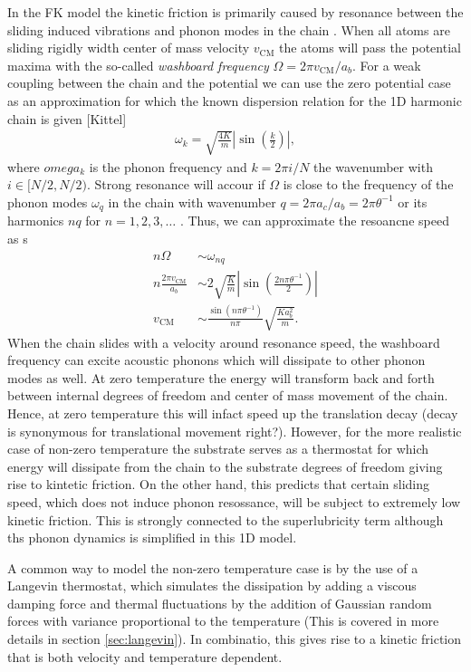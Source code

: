 In the FK model the kinetic friction is primarily caused by resonance between
the sliding induced vibrations and phonon modes in the chain \cite{FK2D}. When all atoms are sliding rigidly width center of mass velocity $v_{{\text{CM}}}$ the atoms will pass the potential maxima with the so-called \textit{washboard frequency} $\Omega = 2\pi v_{{\text{CM}}} / a_b$. For a weak coupling between the chain and the potential we can use the zero potential case as an approximation for which the known dispersion relation for the 1D harmonic chain is given [Kittel]
\begin{align*}
  \omega_k = \sqrt{\frac{4 K}{m}} \left|\sin{\left(\frac{k}{2}\right)}\right|,
\end{align*}
where $omega_k$ is the phonon frequency and $k = 2\pi i / N$ the wavenumber with $i\in [N/2, N/2)$. Strong resonance will accour if $\Omega$ is close to the frequency of the phonon modes $\omega_q$ in the chain with wavenumber $q = 2\pi a_c / a_b = 2\pi \theta^{-1}$ or its harmonics $nq$ for $n = 1, 2, 3, \hdots$ \cite{van_den_Ende_2012}. Thus, we can approximate the resoancne speed as s
\begin{align*}
    n \Omega &\sim \omega_{nq} \\
    n \frac{2\pi v_{\text{CM}}}{a_b} &\sim 2 \sqrt{\frac{K}{m}} \left| \sin{\left(\frac{2n \pi \theta^{-1}}{2}\right)}\right| \\
    v_{\text{CM}} &\sim \frac{\sin{(n\pi \theta^{-1})}}{n \pi} \sqrt{\frac{Ka_b^2}{m}}.
\end{align*}
When the chain slides with a velocity around resonance speed, the washboard frequency can excite acoustic phonons which will dissipate to other phonon modes as well. At zero temperature the energy will transform back and forth between internal degrees of freedom and center of mass movement of the chain. Hence, at zero temperature this will infact speed up the translation decay (decay is synonymous for translational movement right?). However, for the more realistic case of non-zero temperature the substrate serves as a thermostat for which energy will dissipate from the chain to the substrate degrees of freedom giving rise to kintetic friction. On the other hand, this predicts that certain sliding speed, which does not induce phonon resossance, will be subject to extremely low kinetic friction. This is strongly connected to the superlubricity term although ths phonon dynamics is simplified in this 1D model. 

A common way to model the non-zero temperature case is by the
use of a Langevin thermostat, which simulates the dissipation by adding a viscous
damping force and thermal fluctuations by the addition of Gaussian random forces
with variance proportional to the temperature (This is covered in more details
in section \ref{sec:langevin}). In combinatio, this gives rise to a kinetic friction that is both velocity and temperature dependent. 

